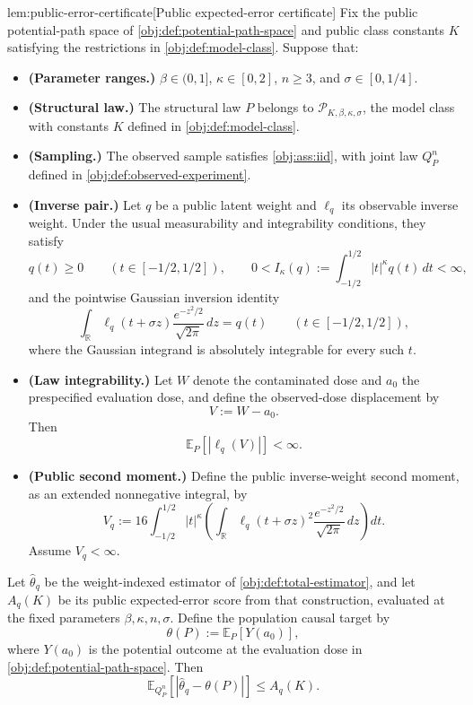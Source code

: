 \documentclass[11pt]{article}
\begin{document}
\begin{lemmav}{lem:public-error-certificate}[Public expected-error certificate]
Fix the public potential-path space of \cref{obj:def:potential-path-space} and public class constants \(K\) satisfying the restrictions in \cref{obj:def:model-class}. Suppose that:
\begin{itemize}
\item \textbf{(Parameter ranges.)} \(\beta\in(0,1]\), \(\kappa\in[0,2]\), \(n\ge3\), and \(\sigma\in[0,1/4]\).
\item \textbf{(Structural law.)} The structural law \(P\) belongs to \(\mathcal P_{K,\beta,\kappa,\sigma}\), the model class with constants \(K\) defined in \cref{obj:def:model-class}.
\item \textbf{(Sampling.)} The observed sample satisfies \cref{obj:ass:iid}, with joint law \(Q_P^n\) defined in \cref{obj:def:observed-experiment}.
\item \textbf{(Inverse pair.)} Let \(q\) be a public latent weight and \(\ell_q\) its observable inverse weight. Under the usual measurability and integrability conditions, they satisfy
\[
q(t)\ge0\qquad(t\in[-1/2,1/2]),
\qquad
0<I_\kappa(q):=\int_{-1/2}^{1/2}|t|^\kappa q(t)\,dt<\infty,
\]
and the pointwise Gaussian inversion identity
\[
\int_{\mathbb R}\ell_q(t+\sigma z)
       \frac{e^{-z^2/2}}{\sqrt{2\pi}}\,dz
=q(t)
\qquad(t\in[-1/2,1/2]),
\]
where the Gaussian integrand is absolutely integrable for every such \(t\).
\item \textbf{(Law integrability.)} Let \(W\) denote the contaminated dose and \(a_0\) the prespecified evaluation dose, and define the observed-dose displacement by
\[
V:=W-a_0.
\]
Then
\[
\mathbb E_P[|\ell_q(V)|]<\infty.
\]
\item \textbf{(Public second moment.)} Define the public inverse-weight second moment, as an extended nonnegative integral, by
\[
V_q:=
16\int_{-1/2}^{1/2}|t|^\kappa
   \left(
   \int_{\mathbb R}\ell_q(t+\sigma z)^2
       \frac{e^{-z^2/2}}{\sqrt{2\pi}}\,dz
   \right)dt.
\]
Assume \(V_q<\infty\).
\end{itemize}
Let \(\widehat\theta_q\) be the weight-indexed estimator of \cref{obj:def:total-estimator}, and let \(A_q(K)\) be its public expected-error score from that construction, evaluated at the fixed parameters \(\beta,\kappa,n,\sigma\). Define the population causal target by
\[
\theta(P):=\mathbb E_P[Y(a_0)],
\]
where \(Y(a_0)\) is the potential outcome at the evaluation dose in \cref{obj:def:potential-path-space}. Then
\[
\mathbb E_{Q_P^n}
 \left[|\widehat\theta_q-\theta(P)|\right]
\le A_q(K).
\]
\end{lemmav}
\end{document}
